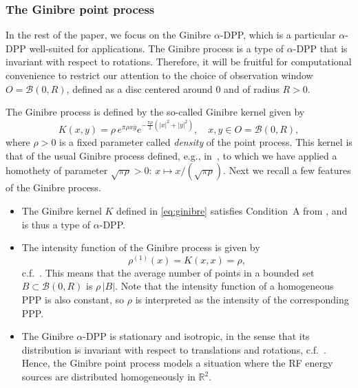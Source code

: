 \documentclass[12pt,draftclsnofoot,onecolumn]{IEEEtran}
\begin{document}
\subsubsection{The Ginibre point process}

In the rest of the paper, we focus on the Ginibre $\alpha$-DPP, which is a particular $\alpha$-DPP well-suited for applications. The Ginibre process is a type of $\alpha$-DPP that is invariant with respect to rotations. Therefore, it will be fruitful for computational convenience to restrict our attention to the choice of observation window $O=\mathcal B(0,R)$, defined as a disc centered around $0$ and of radius $R>0$.

The Ginibre process is defined by the so-called Ginibre kernel given by
\begin{equation}
\label{eq:ginibre}
K(x,y)=\rho\,e^{\pi\rho x \bar{y}} e^{-\frac{\pi\rho}{2}( |x|^2 + |y|^2)},
\quad 
 x,y \in O=\mathcal{B}(0,R),
\end{equation}
where $\rho>0$ is a fixed parameter called {\em density} of the point process.
This kernel is that of the usual Ginibre process defined, e.g., in~\cite{DecreusefondFlintVergne}, to which we have applied a homothety of parameter $\sqrt{\pi\rho}>0$: $x\mapsto x/(\sqrt{\pi\rho})$. Next we recall a few features of the Ginibre process. 
\begin{itemize} 
\item
The Ginibre kernel $K$ defined in \eqref{eq:ginibre} satisfies Condition~A from \cite{ShiraiTakahashi}, and is thus a type of $\alpha$-DPP.
\item The intensity function of the Ginibre process 
is given by 
\begin{equation} 
\label{beq} 
\rho^{(1)}(x)=K(x,x)= \rho, 
\end{equation} 
 c.f.~\cite{ShiraiTakahashi}. This means that the average number of points in a bounded set $B\subset \mathcal{B}(0,R)$ is $\rho\,|B|$. Note that the intensity function of a homogeneous PPP is also constant, so $\rho$ is interpreted as the intensity of the corresponding PPP.
\\ 
 
\item 
The Ginibre $\alpha$-DPP is stationary and isotropic, in the sense that its distribution is invariant with respect to translations and rotations, c.f.~\cite{DecreusefondFlintVergne}. Hence, the Ginibre point process models a situation where the RF energy sources are distributed homogeneously in $\mathbb R^2$.
\end{itemize} 
\end{document}
